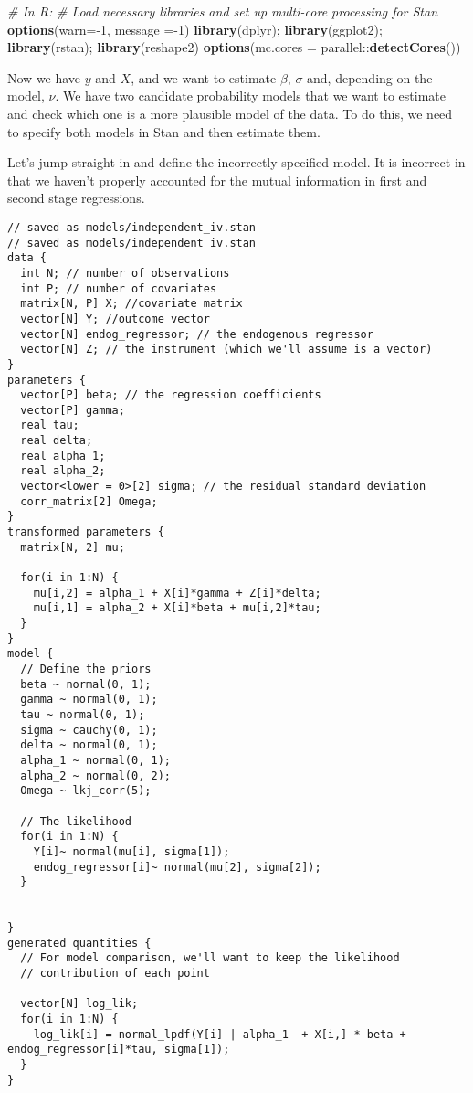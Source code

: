 \documentclass[]{book}
\newenvironment{Shaded}{\begin{snugshade}}{\end{snugshade}}
\newcommand{\KeywordTok}[1]{\textcolor[rgb]{0.13,0.29,0.53}{\textbf{{#1}}}}
\newcommand{\DataTypeTok}[1]{\textcolor[rgb]{0.13,0.29,0.53}{{#1}}}
\newcommand{\DecValTok}[1]{\textcolor[rgb]{0.00,0.00,0.81}{{#1}}}
\newcommand{\CommentTok}[1]{\textcolor[rgb]{0.56,0.35,0.01}{\textit{{#1}}}}
\newcommand{\NormalTok}[1]{{#1}}
\begin{document}
\begin{Shaded}
\begin{Highlighting}[]
\CommentTok{# In R:}
\CommentTok{# Load necessary libraries and set up multi-core processing for Stan}
\KeywordTok{options}\NormalTok{(}\DataTypeTok{warn=}\NormalTok{-}\DecValTok{1}\NormalTok{, }\DataTypeTok{message =}\NormalTok{-}\DecValTok{1}\NormalTok{)}
\KeywordTok{library}\NormalTok{(dplyr); }\KeywordTok{library}\NormalTok{(ggplot2); }\KeywordTok{library}\NormalTok{(rstan); }\KeywordTok{library}\NormalTok{(reshape2)}
\KeywordTok{options}\NormalTok{(}\DataTypeTok{mc.cores =} \NormalTok{parallel::}\KeywordTok{detectCores}\NormalTok{())}
\end{Highlighting}
\end{Shaded}

Now we have \(y\) and \(X\), and we want to estimate \(\beta\),
\(\sigma\) and, depending on the model, \(\nu\). We have two candidate
probability models that we want to estimate and check which one is a
more plausible model of the data. To do this, we need to specify both
models in Stan and then estimate them.

Let's jump straight in and define the incorrectly specified model. It is
incorrect in that we haven't properly accounted for the mutual
information in first and second stage regressions.

\begin{verbatim}
// saved as models/independent_iv.stan
// saved as models/independent_iv.stan
data {
  int N; // number of observations
  int P; // number of covariates
  matrix[N, P] X; //covariate matrix
  vector[N] Y; //outcome vector
  vector[N] endog_regressor; // the endogenous regressor
  vector[N] Z; // the instrument (which we'll assume is a vector)
}
parameters {
  vector[P] beta; // the regression coefficients
  vector[P] gamma;
  real tau;
  real delta;
  real alpha_1;
  real alpha_2;
  vector<lower = 0>[2] sigma; // the residual standard deviation
  corr_matrix[2] Omega;
}
transformed parameters {
  matrix[N, 2] mu;
  
  for(i in 1:N) {
    mu[i,2] = alpha_1 + X[i]*gamma + Z[i]*delta;
    mu[i,1] = alpha_2 + X[i]*beta + mu[i,2]*tau;
  }
}
model {
  // Define the priors
  beta ~ normal(0, 1); 
  gamma ~ normal(0, 1);
  tau ~ normal(0, 1);
  sigma ~ cauchy(0, 1);
  delta ~ normal(0, 1);
  alpha_1 ~ normal(0, 1);
  alpha_2 ~ normal(0, 2);
  Omega ~ lkj_corr(5);
  
  // The likelihood
  for(i in 1:N) {
    Y[i]~ normal(mu[i], sigma[1]);
    endog_regressor[i]~ normal(mu[2], sigma[2]);
  }

  
}
generated quantities {
  // For model comparison, we'll want to keep the likelihood
  // contribution of each point

  vector[N] log_lik;
  for(i in 1:N) {
    log_lik[i] = normal_lpdf(Y[i] | alpha_1  + X[i,] * beta + endog_regressor[i]*tau, sigma[1]);
  }
}
\end{verbatim}
\end{document}
